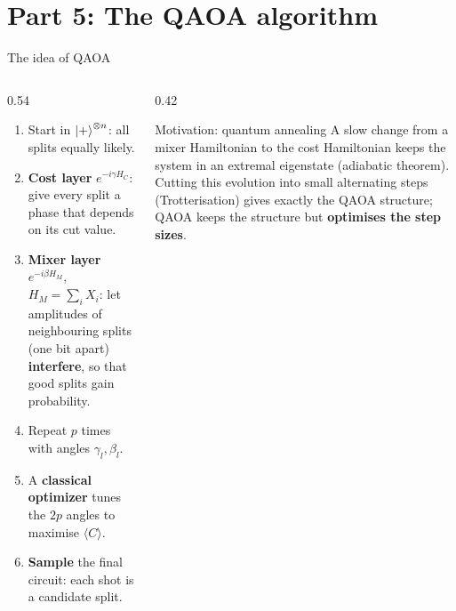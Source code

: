 \documentclass[aspectratio=169,11pt]{beamer}
\newcommand{\hl}[1]{{\color{qorange}\textbf{#1}}}
\newcommand{\key}[1]{{\color{qdark}\textbf{#1}}}
\begin{document}
\section{Part 5: The QAOA algorithm}
\begin{frame}{The idea of QAOA}
  \begin{columns}[c]
    \begin{column}{0.54\textwidth}
      \begin{enumerate}
        \item Start in $\ket+^{\otimes n}$: all splits equally likely.
        \item \key{Cost layer} $e^{-i\gamma H_C}$: give every split a phase that depends on its cut value.
        \item \key{Mixer layer} $e^{-i\beta H_M}$, $H_M = \sum_iX_i$: let amplitudes of neighbouring splits (one bit apart)
          \key{interfere}, so that good splits gain probability.
        \item Repeat $p$ times with angles $\gamma_l, \beta_l$.
        \item A \key{classical optimizer} tunes the $2p$ angles to maximise $\langle C\rangle$.
        \item \key{Sample} the final circuit: each shot is a candidate split.
      \end{enumerate}
    \end{column}
    \begin{column}{0.42\textwidth}
      \begin{block}{Motivation: quantum annealing}
        A slow change from a mixer Hamiltonian to the cost Hamiltonian keeps the system in an extremal
        eigenstate (adiabatic theorem). Cutting this evolution into small alternating steps (Trotterisation)
        gives exactly the QAOA structure; QAOA keeps the structure but \hl{optimises the step sizes}.
      \end{block}
    \end{column}
  \end{columns}
\end{frame}
\end{document}
